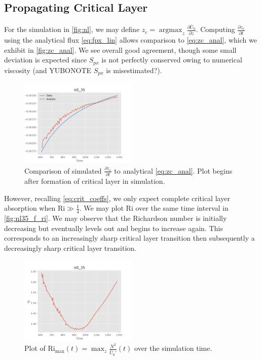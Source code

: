 \documentclass[twocolumn,
        nofootinbib,
        usenames, %
        dvipsnames %
    ]{revtex4-1}%
\newcommand*{\pd}[2]{\frac{\partial#1}{\partial#2}}
\DeclareMathOperator*{\argmax}{argmax}
\begin{document}
\subsection{Propagating Critical Layer}

For the simulation in \autoref{fig:nl}, we may define $z_c = \argmax_z
\pd{\bar{U}_0}{z}$. Computing $\pd{z_c}{t}$ using the analytical flux
\autoref{eq:fpx_lin} allows comparison to \autoref{eq:zc_anal}, which we exhibit
in \autoref{fig:zc_anal}. We see overall good agreement, though some small
deviation is expected since $S_{px}$ is not perfectly conserved owing to
numerical viscosity (and YUBONOTE $S_{px}$ is misestimated?).
\begin{figure}[h]
    \centering
    \includegraphics[width=0.5\textwidth]{plots/nl35_front_v.png}
    \caption{Comparison of simulated $\pd{z_c}{t}$ to analytical
    \autoref{eq:zc_anal}. Plot begins after formation of critical layer in
    simulation.}\label{fig:zc_anal}
\end{figure}

However, recalling \autoref{eq:crit_coeffs}, we only expect complete critical
layer absorption when $\mathrm{Ri} \gg \frac{1}{4}$. We may plot $\mathrm{Ri}$
over the same time interval in \autoref{fig:nl35_f_ri}. We may observe that the
Richardson number is initially decreasing but eventually levels out and
begins to increase again. This corresponds to an increasingly sharp critical
layer transition then subsequently a decreasingly sharp critical layer
transition.
\begin{figure}[h]
    \centering
    \includegraphics[width=0.5\textwidth]{plots/nl35_f_ri.png}
    \caption{Plot of $\mathrm{Ri}_{\max}(t) = \max_z
    \frac{N^2}{\bar{U}_0'}(t)$ over the simulation time.}\label{fig:nl35_f_ri}
\end{figure}
\end{document}
